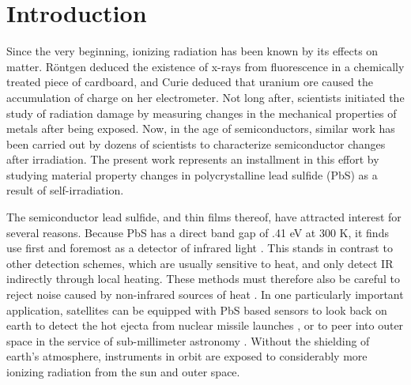 \chapter{Introduction}
Since the very beginning, ionizing radiation has been known by its effects on matter. R\"{o}ntgen deduced the existence of x-rays from fluorescence in a chemically treated piece of cardboard, and Curie deduced that uranium ore caused the accumulation of charge on her electrometer. Not long after, scientists initiated the study of radiation damage by measuring changes in the mechanical properties of metals after being exposed. Now, in the age of semiconductors, similar work has been carried out by dozens of scientists to characterize semiconductor changes after irradiation. The present work represents an installment in this effort by studying material property changes in polycrystalline lead sulfide (PbS) as a result of self-irradiation.

The semiconductor lead sulfide, and thin films thereof, have attracted interest for several reasons. Because PbS has a direct band gap of .41 eV at 300 K, it finds use first and foremost as a detector of infrared light \cite{Machol1993, Machol1994}. This stands in contrast to other detection schemes, which are usually sensitive to heat, and only detect IR indirectly through local heating. These methods must therefore also be careful to reject noise caused by non-infrared sources of heat \cite{Rogalski2012}. In one particularly important application, satellites can be equipped with PbS based sensors to look back on earth to detect the hot ejecta from nuclear missile launches \cite{Rogalski2012}, or to peer into outer space in the service of sub-millimeter astronomy \cite{Baddiley1977}. Without the shielding of earth's atmosphere, instruments in orbit are exposed to considerably more ionizing radiation from the sun and outer space.

